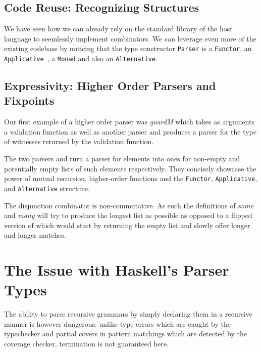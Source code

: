 \documentclass[sigplan,review,anonymous]{acmart}\settopmatter{printfolios=true}
\newcommand{\shgrab}[1]{\medskip\ExecuteMetaData[parser.tex]{#1}}
\newcommand{\hgrab}[1]{\ExecuteMetaData[parser.tex]{#1}}
\newcommand{\parser}[1]{\textit{#1}}
\newcommand{\type}[1]{\texttt{#1}}
\begin{document}
\subsection{Code Reuse: Recognizing Structures}

We have seen how we can already rely on the standard library
of the host language to seemlessly implement combinators.
We can leverage even more of the existing codebase by noticing
that the type constructor \type{Parser} is a \type{Functor},
an \type{Applicative}~\cite{mcbride2008applicative}, a \type{Monad} and also an \type{Alternative}.


\subsection{Expressivity: Higher Order Parsers and Fixpoints}

Our first example of a higher order parser was \parser{guardM}
which takes as arguments a validation function as well as another
parser and produces a parser for the type of witnesses returned
by the validation function.

The two parsers  and  turn a parser for elements
into ones for non-empty and potentially empty lists of such elements
respectively. They concisely showcase the power of mutual recursion,
higher-order functions and the \type{Functor}, \type{Applicative},
and \type{Alternative} structure.

\shgrab{some}
\hgrab{many}

 The disjunction combinator is
non-commutative. As such the definitions of \textit{some} and
\textit{many} will try to produce the longest list as possible
as opposed to a flipped version of  which would start
by returning the empty list and slowly offer longer and longer
matches.


\section{The Issue with Haskell's Parser Types}\label{sec:haskellproblem}

The ability to parse recursive grammars by simply declaring
them in a recursive manner is however dangerous: unlike type
errors which are caught by the typechecker and partial covers
in pattern matchings which are detected by the coverage checker,
termination is not guaranteed here.
\end{document}
